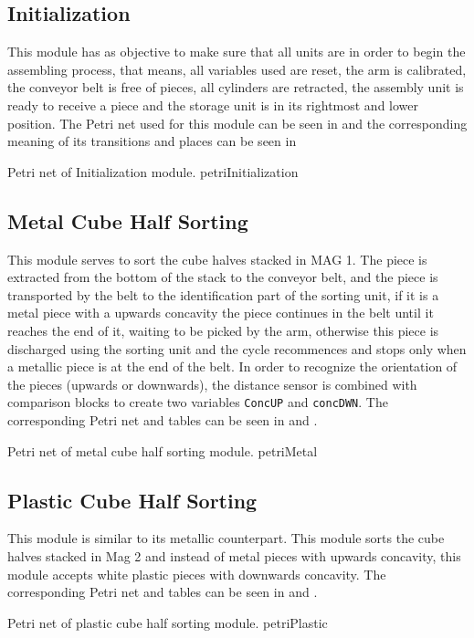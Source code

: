 \subsection{Initialization}
This module has as objective to make sure that all units are in order to begin
the assembling process, that means, all variables used are reset, the arm is
calibrated, the conveyor belt is free of pieces, all cylinders are retracted,
the assembly unit is ready to receive a piece and the storage unit is in its
rightmost and lower position. The Petri net used for this module can be seen in
 and the corresponding meaning of its
transitions and places can be seen in 


{Petri net of Initialization module.}
{petriInitialization}
\subsection{Metal Cube Half Sorting}
This module serves to sort the cube halves stacked in MAG 1. The piece is
extracted from the bottom of the stack to the conveyor belt, and the piece is
transported by the belt to the identification part of the sorting unit, if it is a
metal piece with a upwards concavity the piece continues in the belt until it
reaches the end of it, waiting to be picked by the arm, otherwise this piece is
discharged using the sorting unit and the cycle recommences and stops only when
a metallic piece is at the end of the belt.
In order to recognize the orientation of the pieces (upwards or downwards), the
distance sensor is combined with comparison blocks to create two variables
\verb|ConcUP| and \verb|concDWN|.
The corresponding Petri net and tables can be seen in
 and .


{Petri net of metal cube half sorting module.}
{petriMetal}
\subsection{Plastic Cube Half Sorting}
This module is similar to its metallic counterpart. This module sorts the cube
halves stacked in Mag 2 and instead of metal pieces with upwards concavity, this
module accepts white plastic pieces with downwards concavity.
The corresponding Petri net and tables can be seen in
 and .


{Petri net of plastic cube half sorting module.}
{petriPlastic}

